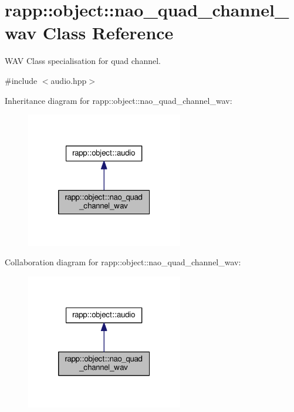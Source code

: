 \hypertarget{classrapp_1_1object_1_1nao__quad__channel__wav}{\section{rapp\-:\-:object\-:\-:nao\-\_\-quad\-\_\-channel\-\_\-wav Class Reference}
\label{classrapp_1_1object_1_1nao__quad__channel__wav}
}


W\-A\-V Class specialisation for quad channel.  




{\ttfamily \#include $<$audio.\-hpp$>$}



Inheritance diagram for rapp\-:\-:object\-:\-:nao\-\_\-quad\-\_\-channel\-\_\-wav\-:
\nopagebreak
\begin{figure}[H]
\begin{center}
\leavevmode
\includegraphics[width=194pt]{classrapp_1_1object_1_1nao__quad__channel__wav__inherit__graph}
\end{center}
\end{figure}


Collaboration diagram for rapp\-:\-:object\-:\-:nao\-\_\-quad\-\_\-channel\-\_\-wav\-:
\nopagebreak
\begin{figure}[H]
\begin{center}
\leavevmode
\includegraphics[width=194pt]{classrapp_1_1object_1_1nao__quad__channel__wav__coll__graph}
\end{center}
\end{figure}
